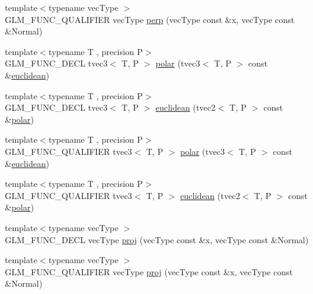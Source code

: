 \begin{DoxyCompactItemize}
\item 
{\footnotesize template$<$typename vec\+Type $>$ }\\G\+L\+M\+\_\+\+F\+U\+N\+C\+\_\+\+Q\+U\+A\+L\+I\+F\+I\+E\+R vec\+Type \hyperlink{group__gtx__perpendicular_ga41f8c73da9798a18e6b1e32f1e301f07}{perp} (vec\+Type const \&x, vec\+Type const \&Normal)
\item 
{\footnotesize template$<$typename T , precision P$>$ }\\G\+L\+M\+\_\+\+F\+U\+N\+C\+\_\+\+D\+E\+C\+L tvec3$<$ T, P $>$ \hyperlink{group__gtx__polar__coordinates_gafcf95a38c780a4ad5ba14c8ac9e522bb}{polar} (tvec3$<$ T, P $>$ const \&\hyperlink{group__gtx__polar__coordinates_ga45ece1fbf7260c43e0f873c498202581}{euclidean})
\item 
{\footnotesize template$<$typename T , precision P$>$ }\\G\+L\+M\+\_\+\+F\+U\+N\+C\+\_\+\+D\+E\+C\+L tvec3$<$ T, P $>$ \hyperlink{group__gtx__polar__coordinates_ga45ece1fbf7260c43e0f873c498202581}{euclidean} (tvec2$<$ T, P $>$ const \&\hyperlink{group__gtx__polar__coordinates_gafcf95a38c780a4ad5ba14c8ac9e522bb}{polar})
\item 
{\footnotesize template$<$typename T , precision P$>$ }\\G\+L\+M\+\_\+\+F\+U\+N\+C\+\_\+\+Q\+U\+A\+L\+I\+F\+I\+E\+R tvec3$<$ T, P $>$ \hyperlink{group__gtx__polar__coordinates_gafcf95a38c780a4ad5ba14c8ac9e522bb}{polar} (tvec3$<$ T, P $>$ const \&\hyperlink{group__gtx__polar__coordinates_ga45ece1fbf7260c43e0f873c498202581}{euclidean})
\item 
{\footnotesize template$<$typename T , precision P$>$ }\\G\+L\+M\+\_\+\+F\+U\+N\+C\+\_\+\+Q\+U\+A\+L\+I\+F\+I\+E\+R tvec3$<$ T, P $>$ \hyperlink{group__gtx__polar__coordinates_ga45ece1fbf7260c43e0f873c498202581}{euclidean} (tvec2$<$ T, P $>$ const \&\hyperlink{group__gtx__polar__coordinates_gafcf95a38c780a4ad5ba14c8ac9e522bb}{polar})
\item 
{\footnotesize template$<$typename vec\+Type $>$ }\\G\+L\+M\+\_\+\+F\+U\+N\+C\+\_\+\+D\+E\+C\+L vec\+Type \hyperlink{group__gtx__projection_gadf29123bcf748fc9d6fb0998192184cf}{proj} (vec\+Type const \&x, vec\+Type const \&Normal)
\item 
{\footnotesize template$<$typename vec\+Type $>$ }\\G\+L\+M\+\_\+\+F\+U\+N\+C\+\_\+\+Q\+U\+A\+L\+I\+F\+I\+E\+R vec\+Type \hyperlink{group__gtx__projection_gadf29123bcf748fc9d6fb0998192184cf}{proj} (vec\+Type const \&x, vec\+Type const \&Normal)

\end{DoxyCompactItemize}

